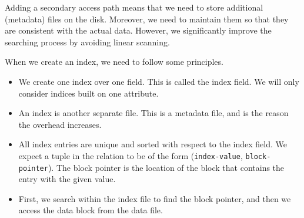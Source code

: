 \documentclass[a4paper, openany]{memoir}
\begin{document}
Adding a secondary access path means that we need to store additional (metadata) files on the disk. Moreover, we need to maintain them so that they are consistent with the actual data. However, we significantly improve the searching process by avoiding linear scanning.

            
            

When we create an index, we need to follow some principles.
\begin{itemize}
    \item We create one index over one field. This is called the index field. We will only consider indices built on one attribute.
    \item An index is another separate file. This is a metadata file, and is the reason the overhead increases.
    \item All index entries are unique and sorted with respect to the index field. We expect a tuple in the relation to be of the form (\texttt{index-value}, \texttt{block-pointer}).
    The block pointer is the location of the block that contains the entry with the given value.
    \item First, we search within the index file to find the block pointer, and then we access the data block from the data file.
\end{itemize}
\end{document}
